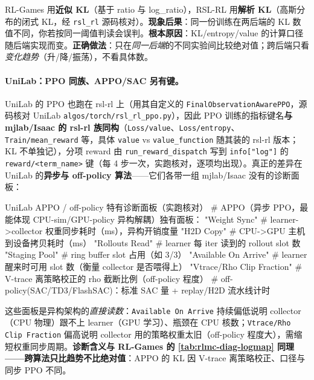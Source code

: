 \begin{pitfall}
RL-Games 用\textbf{近似 KL}（基于 ratio 与 log\_ratio），RSL-RL 用\textbf{解析 KL}（高斯分布的闭式 KL，经 \texttt{rsl\_rl} 源码核对）。\textbf{现象后果}：同一份训练在两后端的 KL 数值不同，你若按同一阈值判读会误判。\textbf{根本原因}：KL/entropy/value 的计算口径随后端实现而变。\textbf{正确做法}：只在\emph{同一后端}的不同实验间比较绝对值；跨后端只看\emph{变化趋势}（升/降/振荡），不看具体数。
\end{pitfall}

\paragraph{UniLab：PPO 同族、APPO/SAC 另有键。}UniLab 的 PPO 也跑在 rsl-rl 上（用其自定义的 \verb|FinalObservationAwarePPO|，源码核对 UniLab \verb|algos/torch/rsl_rl_ppo.py|），因此 PPO 训练的指标键名\textbf{与 mjlab/Isaac 的 rsl-rl 族同构}（\verb|Loss/value|、\verb|Loss/entropy|、\verb|Train/mean_reward| 等，具体 \verb|value| vs \verb|value_function| 随其装的 rsl-rl 版本；KL 不单独记），分项 reward 由 \verb|run_reward_dispatch| 写到 \verb|info["log"]| 的 \verb|reward/<term_name>| 键（每 4 步一次，实跑核对，逐项均出现）。真正的差异在 UniLab 的\textbf{异步与 off-policy 算法}——它们各带一组 mjlab/Isaac 没有的诊断面板：

\begin{codebox}[Python]{UniLab APPO / off-policy 特有诊断面板（实跑核对）}
# APPO（异步 PPO，最能体现 CPU-sim/GPU-policy 异构解耦）独有面板：
"Weight Sync"            # learner->collector 权重同步耗时（ms），异构开销度量
"H2D Copy"               # CPU->GPU 主机到设备拷贝耗时（ms）
"Rollouts Read"          # learner 每 iter 读到的 rollout slot 数
"Staging Pool"           # ring buffer slot 占用（如 3/3）
"Available On Arrive"    # learner 醒来时可用 slot 数（衡量 collector 是否喂得上）
"Vtrace/Rho Clip Fraction"  # V-trace 离策略校正的 rho 截断比例（off-policy 程度）
# off-policy(SAC/TD3/FlashSAC)：标准 SAC 量 + replay/H2D 流水线计时
\end{codebox}

这些面板是异构架构的\emph{直接读数}：\verb|Available On Arrive| 持续偏低说明 collector（CPU 物理）跟不上 learner（GPU 学习）、瓶颈在 CPU 核数；\verb|Vtrace/Rho Clip Fraction| 偏高说明 collector 用的策略权重太旧（off-policy 程度大），需缩短权重同步周期。\textbf{诊断含义与 RL-Games 的 \cref{tab:rlmc-diag-logmap} 同理——跨算法只比趋势不比绝对值}：APPO 的 KL 因 V-trace 离策略校正、口径与同步 PPO 不同。

